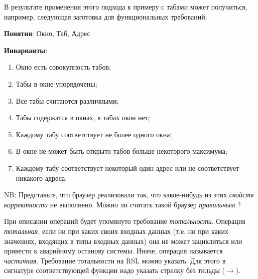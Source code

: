 \documentclass[14pt, twoside]{extreport}
\begin{document}

В результате применения этого подхода к примеру с табами может получиться, например, следующая заготовка для функциональных требований:

{\sf
\textbf{Понятия}: Окно, Таб, Адрес

\textbf{Инварианты}:
\begin{enumerate}
  \item Окно есть совокупность табов;
  \item Табы в окне упорядочены;
  \item Все табы считаются различными;
  \item Табы содержатся в окнах, в табах окон нет;
  \item Каждому табу соответствует не более одного окна;
  \item В окне не может быть открыто табов больше некоторого максимума;
  \item Каждому табу соответствует некоторый один адрес или не соответствует никакого адреса.
\end{enumerate}
}

NB: Представьте, что браузер реализовали так, что какое-нибудь из этих \emph{свойств корректности} не выполнено. Можно ли считать такой браузер \emph{правильным} ?

При описании операций будет упомянуто требование \emph{тотальности}. Операция \emph{тотальная}, если ни при каких своих входных данных (т.е. ни при каких значениях, входящих в типы входных данных) она не может зациклиться или привести к аварийному останову системы. Иначе, операция называется \emph{частичная}. Требование тотальности на RSL можно указать. Для этого в сигнатуре соответствующей функции надо указать стрелку без тильды ($\rightarrow$).
\end{document}
